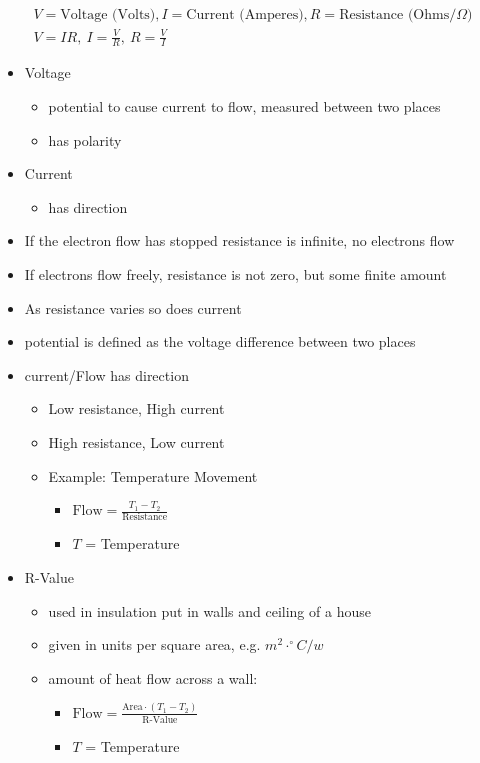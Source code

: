 \documentclass[10pt, letterpaper]{article}
\begin{document}
\begin{gather*}
  V=\text{Voltage (Volts)}, I=\text{Current (Amperes)}, R=\text{Resistance (Ohms/$\Omega$)}\\
  V=IR, ~I=\frac{V}{R}, ~R=\frac{V}{I}
\end{gather*}
\begin{itemize}
  \item Voltage
  \begin{itemize}
    \item potential to cause current to flow, measured between two places
    \item has polarity
  \end{itemize}

  \item Current
  \begin{itemize}
    \item has direction
  \end{itemize}

  \item If the electron flow has stopped resistance is infinite, no electrons flow
  \item If electrons flow freely, resistance is not zero, but some finite amount
  \item As resistance varies so does current
  \item potential is defined as the voltage difference between two places

  \item current/Flow has direction
  \begin{itemize}
    \item Low resistance, High current
    \item High resistance, Low current
    \item Example: Temperature Movement
    \begin{itemize}
      \item $\text{Flow} = \frac{T_1-T_2}{\text{Resistance}}$
      \item $T$ = Temperature
    \end{itemize}
  \end{itemize}

  \item R-Value
  \begin{itemize}
    \item used in insulation put in walls and ceiling of a house
    \item given in units per square area, e.g. $m^2\cdot ^{\circ} C/w$
    \item amount of heat flow across a wall:
    \begin{itemize}
      \item $\text{Flow} = \frac{\text{Area}\cdot (T_1-T_2)}{\text{R-Value}}$
      \item $T$ = Temperature
    \end{itemize}
  \end{itemize}


\end{itemize}
\end{document}
